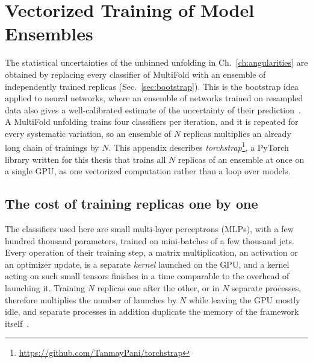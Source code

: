 \chapter{Vectorized Training of Model Ensembles}
\label{app:torchstrap}

The statistical uncertainties of the unbinned unfolding in Ch.~\ref{ch:angularities} are obtained by replacing every classifier of MultiFold with an ensemble of independently trained replicas (Sec.~\ref{sec:bootstrap}).
%
This is the bootstrap idea~\cite{Efron:1979bootstrap} applied to neural networks, where an ensemble of networks trained on resampled data also gives a well-calibrated estimate of the uncertainty of their prediction~\cite{Lakshminarayanan:2016ensembles}.
%
A MultiFold unfolding trains four classifiers per iteration, and it is repeated for every systematic variation, so an ensemble of \(N\) replicas multiplies an already long chain of trainings by \(N\).
%
This appendix describes \emph{torchstrap}\footnote{\url{https://github.com/TanmayPani/torchstrap}}, a PyTorch~\cite{Paszke:2019pytorch} library written for this thesis that trains all \(N\) replicas of an ensemble at once on a single GPU, as one vectorized computation rather than a loop over models.

\section{The cost of training replicas one by one}
\label{sec:tsMotivation}
The classifiers used here are small multi-layer perceptrons (MLPs), with a few hundred thousand parameters, trained on mini-batches of a few thousand jets.
%
Every operation of their training step, a matrix multiplication, an activation or an optimizer update, is a separate \emph{kernel} launched on the GPU, and a kernel acting on such small tensors finishes in a time comparable to the overhead of launching it.
%
Training \(N\) replicas one after the other, or in \(N\) separate processes, therefore multiplies the number of launches by \(N\) while leaving the GPU mostly idle, and separate processes in addition duplicate the memory of the framework itself~\cite{Whitney2021Parallelizing}.

